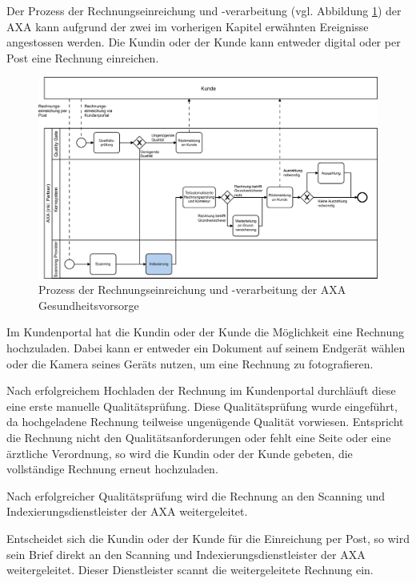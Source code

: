 Der Prozess der Rechnungseinreichung und -verarbeitung (vgl. Abbildung \ref{prozessaxa}) der AXA kann aufgrund der zwei im vorherigen Kapitel erwähnten Ereignisse angestossen werden. Die Kundin oder der Kunde kann entweder digital oder per Post eine Rechnung einreichen. 

\begin{figure}[h]
    \captionsetup{width=.9\linewidth}
    \caption[Prozess der Rechnungseinreichung und -verarbeitung der AXA Gesundheitsvorsorge]{Prozess der Rechnungseinreichung und -verarbeitung der AXA Gesundheitsvorsorge}
    \label{prozessaxa}
    \centering
    \vspace{0.2cm}
    \includegraphics[width=\textwidth]{graphics/rechnungseinreichung-bpmn.pdf}
\end{figure}

Im Kundenportal hat die Kundin oder der Kunde die Möglichkeit eine Rechnung hochzuladen. Dabei kann er entweder ein Dokument auf seinem Endgerät wählen oder die Kamera seines Geräts nutzen, um eine Rechnung zu fotografieren.

Nach erfolgreichem Hochladen der Rechnung im Kundenportal durchläuft diese eine erste manuelle Qualitätsprüfung. Diese Qualitätsprüfung wurde eingeführt, da hochgeladene Rechnung teilweise ungenügende Qualität vorwiesen. Entspricht die Rechnung nicht den Qualitätsanforderungen oder fehlt eine Seite oder eine ärztliche Verordnung, so wird die Kundin oder der Kunde gebeten, die vollständige Rechnung erneut hochzuladen.

Nach erfolgreicher Qualitätsprüfung wird die Rechnung an den Scanning und Indexierungsdienstleister der AXA weitergeleitet.

Entscheidet sich die Kundin oder der Kunde für die Einreichung per Post, so wird sein Brief direkt an den Scanning und Indexierungsdienstleister der AXA weitergeleitet. Dieser Dienstleister scannt die weitergeleitete Rechnung ein.

